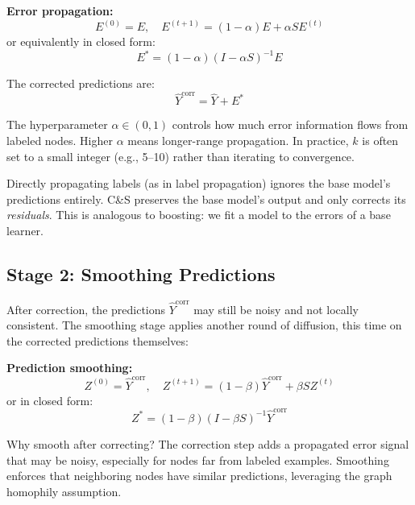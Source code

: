 \begin{notechapter}
\begin{correctionbox}
\textbf{Error propagation:}
\begin{equation}
E^{(0)} = E, \quad E^{(t+1)} = (1-\alpha) E + \alpha S E^{(t)}
\end{equation}
or equivalently in closed form:
\begin{equation}
E^* = (1-\alpha)(I - \alpha S)^{-1} E
\end{equation}

The corrected predictions are:
\begin{equation}
\hat{Y}^{\text{corr}} = \hat{Y} + E^*
\end{equation}
\end{correctionbox}

The hyperparameter $\alpha \in (0,1)$ controls how much error information flows
from labeled nodes. Higher $\alpha$ means longer-range propagation. In practice,
$k$ is often set to a small integer (e.g., 5--10) rather than iterating to
convergence.

\begin{remark}
Directly propagating labels (as in label propagation) ignores the base model's
predictions entirely. C\&S preserves the base model's output and only corrects
its \emph{residuals}. This is analogous to boosting: we fit a model to the
errors of a base learner.
\end{remark}

\subsection{Stage 2: Smoothing Predictions}

After correction, the predictions $\hat{Y}^{\text{corr}}$ may still be noisy
and not locally consistent. The smoothing stage applies another round of
diffusion, this time on the corrected predictions themselves:

\begin{smoothingbox}
\textbf{Prediction smoothing:}
\begin{equation}
Z^{(0)} = \hat{Y}^{\text{corr}}, \quad Z^{(t+1)} = (1-\beta) \hat{Y}^{\text{corr}} + \beta S Z^{(t)}
\end{equation}
or in closed form:
\begin{equation}
Z^* = (1-\beta)(I - \beta S)^{-1} \hat{Y}^{\text{corr}}
\end{equation}
\end{smoothingbox}

Why smooth after correcting? The correction step adds a propagated error signal
that may be noisy, especially for nodes far from labeled examples. Smoothing
enforces that neighboring nodes have similar predictions, leveraging the graph
homophily assumption.


\end{notechapter}
